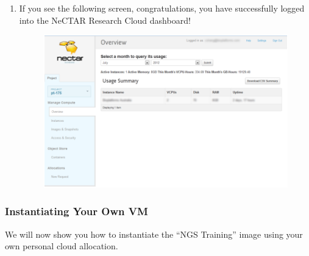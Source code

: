 \begin{enumerate}
\begin{figure}[H]
    \caption{\label{fig:aaf_home_institute}}
  \end{figure}
  \item If you see the following screen, congratulations, you have
  successfully logged into the NeCTAR Research Cloud dashboard!
  \begin{figure}[H]
    \centering
    \includegraphics[scale=0.5]{post-workshop/nectar/dashboard_overview.png}
    \caption{\label{fig:dashboard_overview}}
  \end{figure}
\end{enumerate}

\subsubsection{Instantiating Your Own VM}
We will now show you how to instantiate the ``NGS Training'' image using your
own personal cloud allocation.

